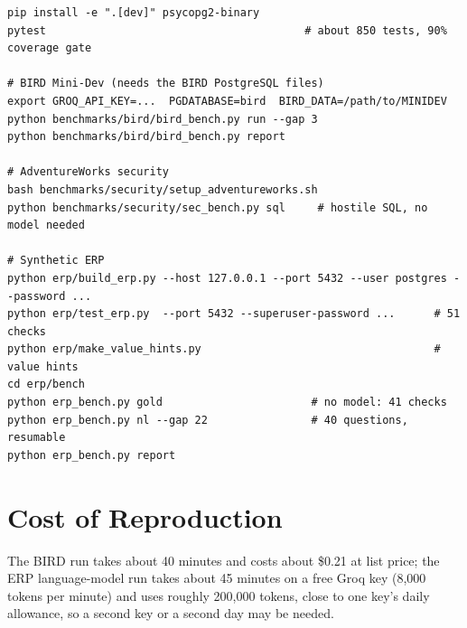 \begin{lstlisting}[caption={Installing, testing and running the three tracks (paths relative to the repository).}]
pip install -e ".[dev]" psycopg2-binary
pytest                                        # about 850 tests, 90% coverage gate

# BIRD Mini-Dev (needs the BIRD PostgreSQL files)
export GROQ_API_KEY=...  PGDATABASE=bird  BIRD_DATA=/path/to/MINIDEV
python benchmarks/bird/bird_bench.py run --gap 3
python benchmarks/bird/bird_bench.py report

# AdventureWorks security
bash benchmarks/security/setup_adventureworks.sh
python benchmarks/security/sec_bench.py sql     # hostile SQL, no model needed

# Synthetic ERP
python erp/build_erp.py --host 127.0.0.1 --port 5432 --user postgres --password ...
python erp/test_erp.py  --port 5432 --superuser-password ...      # 51 checks
python erp/make_value_hints.py                                    # value hints
cd erp/bench
python erp_bench.py gold                       # no model: 41 checks
python erp_bench.py nl --gap 22                # 40 questions, resumable
python erp_bench.py report
\end{lstlisting}

\section{Cost of Reproduction}

The BIRD run takes about 40 minutes and costs about \$0.21 at list price; the ERP language-model run takes
about 45 minutes on a free Groq key (8,000 tokens per minute) and uses roughly 200,000 tokens, close to one
key's daily allowance, so a second key or a second day may be needed.
